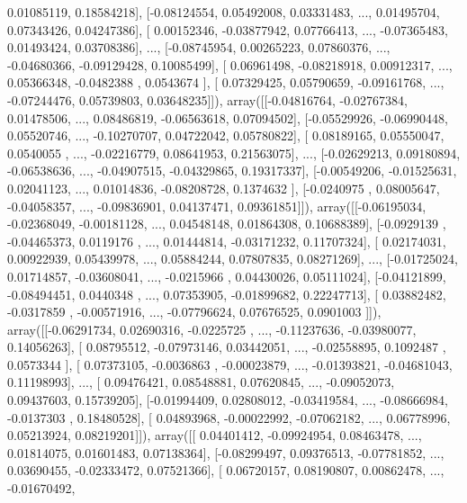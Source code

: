\documentclass{article}
\begin{document}
         0.01085119,  0.18584218],
       [-0.08124554,  0.05492008,  0.03331483, ...,  0.01495704,
         0.07343426,  0.04247386],
       [ 0.00152346, -0.03877942,  0.07766413, ..., -0.07365483,
         0.01493424,  0.03708386],
       ..., 
       [-0.08745954,  0.00265223,  0.07860376, ..., -0.04680366,
        -0.09129428,  0.10085499],
       [ 0.06961498, -0.08218918,  0.00912317, ...,  0.05366348,
        -0.0482388 ,  0.0543674 ],
       [ 0.07329425,  0.05790659, -0.09161768, ..., -0.07244476,
         0.05739803,  0.03648235]]), array([[-0.04816764, -0.02767384,  0.01478506, ...,  0.08486819,
        -0.06563618,  0.07094502],
       [-0.05529926, -0.06990448,  0.05520746, ..., -0.10270707,
         0.04722042,  0.05780822],
       [ 0.08189165,  0.05550047,  0.0540055 , ..., -0.02216779,
         0.08641953,  0.21563075],
       ..., 
       [-0.02629213,  0.09180894, -0.06538636, ..., -0.04907515,
        -0.04329865,  0.19317337],
       [-0.00549206, -0.01525631,  0.02041123, ...,  0.01014836,
        -0.08208728,  0.1374632 ],
       [-0.0240975 ,  0.08005647, -0.04058357, ..., -0.09836901,
         0.04137471,  0.09361851]]), array([[-0.06195034, -0.02368049, -0.00181128, ...,  0.04548148,
         0.01864308,  0.10688389],
       [-0.0929139 , -0.04465373,  0.0119176 , ...,  0.01444814,
        -0.03171232,  0.11707324],
       [ 0.02174031,  0.00922939,  0.05439978, ...,  0.05884244,
         0.07807835,  0.08271269],
       ..., 
       [-0.01725024,  0.01714857, -0.03608041, ..., -0.0215966 ,
         0.04430026,  0.05111024],
       [-0.04121899, -0.08494451,  0.0440348 , ...,  0.07353905,
        -0.01899682,  0.22247713],
       [ 0.03882482, -0.0317859 , -0.00571916, ..., -0.07796624,
         0.07676525,  0.0901003 ]]), array([[-0.06291734,  0.02690316, -0.0225725 , ..., -0.11237636,
        -0.03980077,  0.14056263],
       [ 0.08795512, -0.07973146,  0.03442051, ..., -0.02558895,
         0.1092487 ,  0.0573344 ],
       [ 0.07373105, -0.0036863 , -0.00023879, ..., -0.01393821,
        -0.04681043,  0.11198993],
       ..., 
       [ 0.09476421,  0.08548881,  0.07620845, ..., -0.09052073,
         0.09437603,  0.15739205],
       [-0.01994409,  0.02808012, -0.03419584, ..., -0.08666984,
        -0.0137303 ,  0.18480528],
       [ 0.04893968, -0.00022992, -0.07062182, ...,  0.06778996,
         0.05213924,  0.08219201]]), array([[ 0.04401412, -0.09924954,  0.08463478, ...,  0.01814075,
         0.01601483,  0.07138364],
       [-0.08299497,  0.09376513, -0.07781852, ...,  0.03690455,
        -0.02333472,  0.07521366],
       [ 0.06720157,  0.08190807,  0.00862478, ..., -0.01670492,
\end{document}
